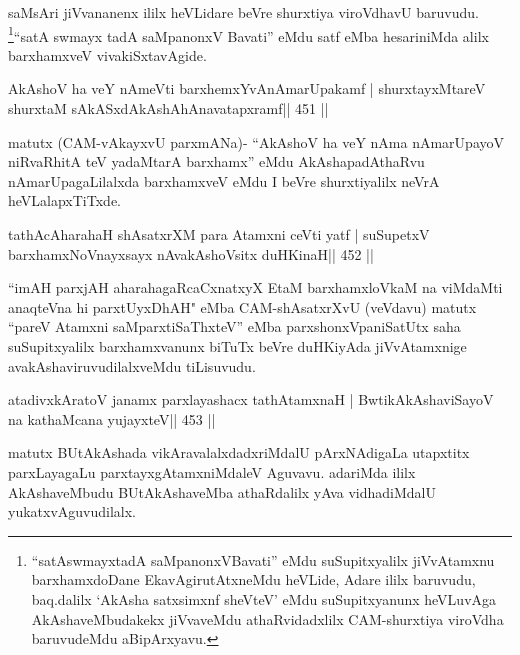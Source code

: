 \begin{artha}
saMsAri jiVvananenx ililx heVLidare beVre shurxtiya viroVdhavU
baruvudu. \footnote{``satAswmayxtadA saMpanonxVBavati'' eMdu suSupitxyalilx jiVvAtamxnu
barxhamxdoDane EkavAgirutAtxneMdu heVLide, Adare ililx baruvudu,
baq.dalilx `AkAsha satxsimxnf sheVteV' eMdu suSupitxyanunx heVLuvAga
AkAshaveMbudakekx jiVvaveMdu athaRvidadxlilx CAM-shurxtiya viroVdha
baruvudeMdu aBipArxyavu.}``satA swmayx tadA saMpanonxV Bavati'' eMdu satf eMba
hesariniMda alilx barxhamxveV vivakiSxtavAgide.
\end{artha}


\begin{shl}
AkAshoV ha veY nAmeVti barxhemxYvAnAmarUpakamf |
shurxtayxMtareV shurxtaM sAkASxdAkAshAhAnavatapxramf\hfill || 451 ||
\end{shl}

\begin{artha}
matutx (CAM-vAkayxvU parxmANa)- ``AkAshoV ha veY nAma nAmarUpayoV niRvaRhitA teV yadaMtarA barxhamx'' eMdu AkAshapadAthaRvu nAmarUpagaLilalxda barxhamxveV eMdu I beVre shurxtiyalilx neVrA heVLalapxTiTxde.
\end{artha}

\begin{shl}
tathAcAharahaH shAsatxrXM para Atamxni ceVti yatf |
suSupetxV barxhamxNoV\s nayxsayx nAvakAshoV\s sitx duHKinaH\hfill || 452 ||
\end{shl}

\begin{artha}
``imAH parxjAH aharahagaRcaCxnatxyX EtaM barxhamxloVkaM na viMdaMti   anaqteVna hi parxtUyxDhAH" eMba CAM-shAsatxrXvU (veVdavu) matutx   ``pareV Atamxni saMparxtiSaThxteV'' eMba parxshonxVpaniSatUtx saha   suSupitxyalilx barxhamxvanunx biTuTx beVre duHKiyAda jiVvAtamxnige   avakAshaviruvudilalxveMdu tiLisuvudu.
\end{artha}

\begin{shl}
atadivxkAratoV janamx parxlayashacx tathA\s\s tamxnaH |
BwtikAkAshaviSayoV na kathaMcana yujayxteV\hfill || 453 ||
\end{shl}

\begin{artha}
matutx BUtAkAshada vikAravalalxdadxriMdalU pArxNAdigaLa utapxtitx parxLayagaLu parxtayxgAtamxniMdaleV Aguvavu. adariMda ililx AkAshaveMbudu BUtAkAshaveMba athaRdalilx yAva vidhadiMdalU yukatxvAguvudilalx.
\end{artha}



